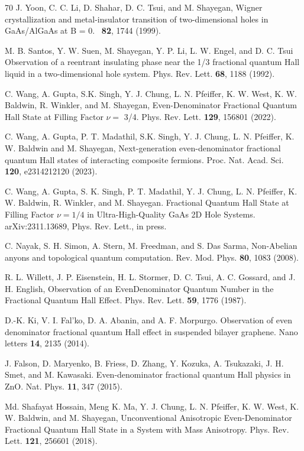 \documentclass[reprint,amsmath,amssymb,aps,prl,nobibnotes,superscriptaddress]{revtex4-1}
\begin{document}
\begin{thebibliography}{70}
 J. Yoon, C. C. Li, D. Shahar, D. C. Tsui, and M. Shayegan, Wigner crystallization and metal-insulator
transition of two-dimensional holes in GaAs/AlGaAs at
B = 0. \prl \ \textbf{82}, 1744 (1999).

 M. B. Santos, Y. W. Suen, M. Shayegan, Y. P. Li, L. W. Engel, and D. C. Tsui Observation of a reentrant
insulating phase near the 1/3 fractional quantum Hall
liquid in a two-dimensional hole system. Phys. Rev. Lett.
\textbf{68}, 1188 (1992).

 C. Wang, A. Gupta, S.K. Singh, Y. J. Chung, L. N. Pfeiffer, K. W. West, K. W. Baldwin, R. Winkler, and M. Shayegan, Even-Denominator Fractional Quantum
Hall State at Filling Factor $\nu=$ 3/4. Phys. Rev.
Lett. \textbf{129}, 156801 (2022).

 C. Wang, A. Gupta, P. T. Madathil, S.K. Singh, Y. J. Chung, L. N. Pfeiffer, K. W. Baldwin and M. Shayegan, Next-generation even-denominator fractional quantum Hall states of interacting composite fermions. Proc. Nat. Acad. Sci. \textbf{120}, e2314212120 (2023).

 C. Wang, A. Gupta, S. K. Singh, P. T. Madathil, Y. J. Chung, L. N. Pfeiffer, K. W. Baldwin, R. Winkler, and M. Shayegan. Fractional Quantum Hall State at Filling Factor $\nu= 1/4$ in Ultra-High-Quality GaAs 2D Hole Systems. arXiv:2311.13689, Phys. Rev. Lett., in press.

C. Nayak, S. H. Simon, A. Stern, M. Freedman, and S. Das Sarma, Non-Abelian anyons
and topological quantum computation. Rev. Mod. Phys.
\textbf{80}, 1083 (2008).

R. L. Willett, J. P. Eisenstein, H. L. Stormer, D. C. Tsui,
A. C. Gossard, and J. H. English, Observation of an EvenDenominator Quantum Number in the Fractional Quantum
Hall Effect. Phys. Rev. Lett. \textbf{59}, 1776 (1987).

 D.-K. Ki,  V. I. Fal’ko, D. A. Abanin, and A. F. Morpurgo. Observation of even denominator fractional quantum Hall effect in suspended bilayer graphene. Nano letters \textbf{14}, 2135 (2014).

 J. Falson, D. Maryenko, B. Friess, D. Zhang, Y. Kozuka, A. Tsukazaki, J. H. Smet, and M. Kawasaki. Even-denominator fractional quantum Hall physics in ZnO. Nat. Phys. \textbf{11}, 347 (2015).

 Md. Shafayat Hossain, Meng K. Ma, Y. J. Chung, L. N. Pfeiffer, K. W. West, K. W. Baldwin, and M. Shayegan, Unconventional Anisotropic Even-Denominator Fractional
Quantum Hall State in a System with Mass Anisotropy.
Phys. Rev. Lett. \textbf{121}, 256601 (2018).


\end{thebibliography}
\end{document}
